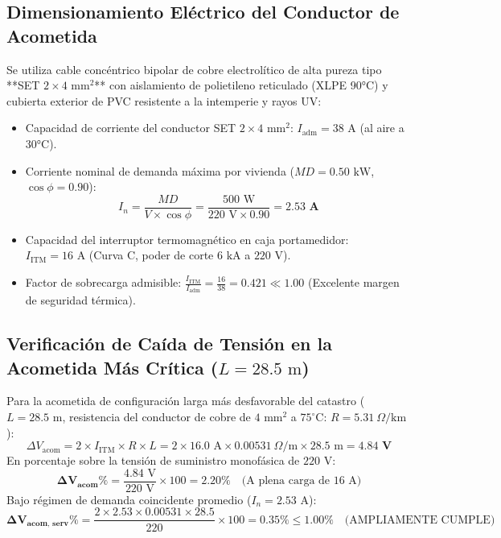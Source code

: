 \subsection{Dimensionamiento Eléctrico del Conductor de Acometida}
Se utiliza cable concéntrico bipolar de cobre electrolítico de alta pureza tipo **SET $2 \times 4\text{ mm}^2$** con aislamiento de polietileno reticulado (XLPE 90°C) y cubierta exterior de PVC resistente a la intemperie y rayos UV:
\begin{itemize}
    \item Capacidad de corriente del conductor SET $2 \times 4\text{ mm}^2$: $I_{\text{adm}} = 38\text{ A}$ (al aire a 30°C).
    \item Corriente nominal de demanda máxima por vivienda ($MD = 0.50\text{ kW}$, $\cos\phi = 0.90$):
      $$I_n = \frac{MD}{V \times \cos\phi} = \frac{500\text{ W}}{220\text{ V} \times 0.90} = \mathbf{2.53\text{ A}}$$
    \item Capacidad del interruptor termomagnético en caja portamedidor: $I_{\text{ITM}} = 16\text{ A}$ (Curva C, poder de corte $6\text{ kA}$ a $220\text{ V}$).
    \item Factor de sobrecarga admisible: $\frac{I_{\text{ITM}}}{I_{\text{adm}}} = \frac{16}{38} = 0.421 \ll 1.00$ (Excelente margen de seguridad térmica).
\end{itemize}

\subsection{Verificación de Caída de Tensión en la Acometida Más Crítica ($L = 28.5\text{ m}$)}
Para la acometida de configuración larga más desfavorable del catastro ($L = 28.5\text{ m}$, resistencia del conductor de cobre de $4\text{ mm}^2$ a $75^\circ\text{C}$: $R = 5.31\ \Omega/\text{km}$):
$$\Delta V_{\text{acom}} = 2 \times I_{\text{ITM}} \times R \times L = 2 \times 16.0\text{ A} \times 0.00531\ \Omega/\text{m} \times 28.5\text{ m} = \mathbf{4.84\text{ V}}$$
En porcentaje sobre la tensión de suministro monofásica de $220\text{ V}$:
$$\mathbf{\Delta V_{\text{acom}}\%} = \frac{4.84\text{ V}}{220\text{ V}} \times 100 = \mathbf{2.20\%} \quad \text{(A plena carga de 16 A)}$$
Bajo régimen de demanda coincidente promedio ($I_n = 2.53\text{ A}$):
$$\mathbf{\Delta V_{\text{acom, serv}}\%} = \frac{2 \times 2.53 \times 0.00531 \times 28.5}{220} \times 100 = \mathbf{0.35\%} \le \mathbf{1.00\%} \quad \text{(AMPLIAMENTE CUMPLE)}$$
